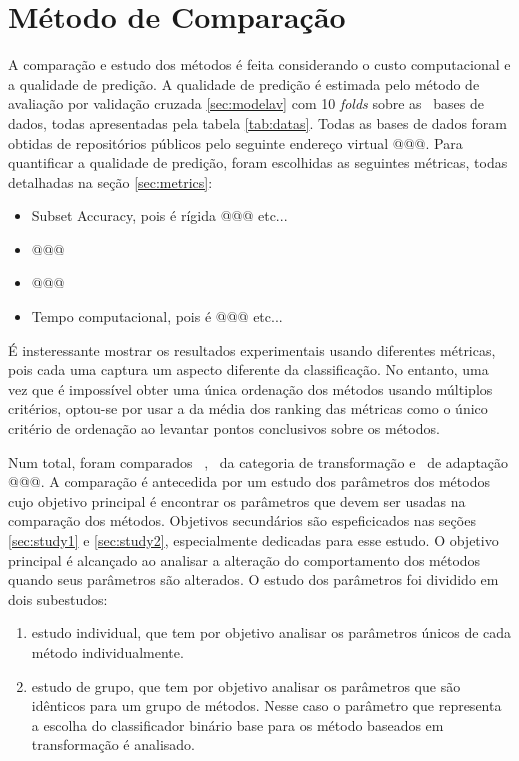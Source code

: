 \section{Método de Comparação}
\label{sec:methodcomp}

A comparação e estudo dos métodos é feita considerando o custo computacional e a qualidade de predição.
A qualidade de predição é estimada pelo método de avaliação por validação cruzada \ref{sec:modelav} com 10 \textit{folds}
sobre as \Nbases~bases de dados, todas apresentadas pela tabela \ref{tab:datas}.
Todas as bases de dados foram obtidas de repositórios públicos pelo seguinte
endereço virtual @@@.
Para quantificar a qualidade de predição, foram escolhidas as seguintes métricas, todas detalhadas na seção \ref{sec:metrics}:

\begin{itemize}
 \item Subset Accuracy, pois é rígida @@@ etc...
 \item @@@
 \item @@@
 \item Tempo computacional, pois é @@@ etc...
\end{itemize}

É insteressante mostrar os resultados experimentais usando diferentes métricas, pois cada uma captura
um aspecto diferente da classificação.
No entanto, uma vez que é impossível obter uma única ordenação dos métodos
usando múltiplos critérios,
optou-se por usar a da média dos ranking das métricas como
o único critério de ordenação ao levantar pontos conclusivos sobre os métodos. 

Num total, foram comparados \Nml~\MML, \NmlT~da categoria de transformação e \NmlA~de adaptação @@@.
A comparação é antecedida por um estudo dos parâmetros dos métodos
cujo objetivo principal é encontrar os parâmetros que devem ser usadas na comparação dos métodos. Objetivos secundários são
espeficicados nas seções \ref{sec:study1} e \ref{sec:study2}, especialmente dedicadas para esse estudo.
O objetivo principal é alcançado ao analisar a alteração do comportamento dos métodos quando seus parâmetros são alterados.
O estudo dos parâmetros foi dividido em dois subestudos:
\begin{enumerate}
 \item estudo individual, que tem por objetivo analisar os parâmetros únicos de cada método individualmente.
  \item estudo de grupo, que tem por objetivo analisar os parâmetros que são idênticos para um grupo de métodos.
  Nesse caso o parâmetro que representa a escolha do classificador binário base para os método baseados em transformação é
  analisado. 
\end{enumerate}

